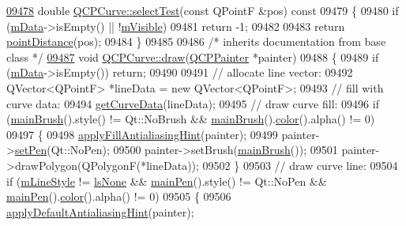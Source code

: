 \begin{DoxyCode}
\hypertarget{a00115_source_l09478}{}\hyperlink{a00028_a01f92730eb23ad5b222be95f2b7aa500}{09478} \textcolor{keywordtype}{double} \hyperlink{a00028_a01f92730eb23ad5b222be95f2b7aa500}{QCPCurve::selectTest}(\textcolor{keyword}{const} QPointF &pos)\textcolor{keyword}{ const}
09479 \textcolor{keyword}{}\{
09480   \textcolor{keywordflow}{if} (\hyperlink{a00028_a88d533e455bca96004b049e99168731b}{mData}->isEmpty() || !\hyperlink{a00044_a62e3aed8427d6ce3ccf716f285106cb3}{mVisible})
09481     \textcolor{keywordflow}{return} -1;
09482   
09483   \textcolor{keywordflow}{return} \hyperlink{a00028_acd7a68c6f268ce1ab845eaf69fc2c6a6}{pointDistance}(pos);
09484 \}
09485 
09486 \textcolor{comment}{/* inherits documentation from base class */}
\hypertarget{a00115_source_l09487}{}\hyperlink{a00028_a2361302d2fc6ec669849bd3bca00c4b2}{09487} \textcolor{keywordtype}{void} \hyperlink{a00028_a2361302d2fc6ec669849bd3bca00c4b2}{QCPCurve::draw}(\hyperlink{a00047}{QCPPainter} *painter)
09488 \{
09489   \textcolor{keywordflow}{if} (\hyperlink{a00028_a88d533e455bca96004b049e99168731b}{mData}->isEmpty()) \textcolor{keywordflow}{return};
09490   
09491   \textcolor{comment}{// allocate line vector:}
09492   QVector<QPointF> *lineData = \textcolor{keyword}{new} QVector<QPointF>;
09493   \textcolor{comment}{// fill with curve data:}
09494   \hyperlink{a00028_afa895f8ba9ae34fea6ecea295fd7b1e5}{getCurveData}(lineData);
09495   \textcolor{comment}{// draw curve fill:}
09496   \textcolor{keywordflow}{if} (\hyperlink{a00024_ae74c123832da180c17e22203e748d9b7}{mainBrush}().style() != Qt::NoBrush && \hyperlink{a00024_ae74c123832da180c17e22203e748d9b7}{mainBrush}().\hyperlink{a00116_ae35093fbf4f645dcefd930ca8c68b622}{color}().alpha() != 0)
09497   \{
09498     \hyperlink{a00024_ac08a480155895e674dbfe5a5670e0ff3}{applyFillAntialiasingHint}(painter);
09499     painter->\hyperlink{a00047_af9c7a4cd1791403901f8c5b82a150195}{setPen}(Qt::NoPen);
09500     painter->setBrush(\hyperlink{a00024_ae74c123832da180c17e22203e748d9b7}{mainBrush}());
09501     painter->drawPolygon(QPolygonF(*lineData));
09502   \}
09503   \textcolor{comment}{// draw curve line:}
09504   \textcolor{keywordflow}{if} (\hyperlink{a00028_ae1f35ae2b15aee8e15bcdfec5be95156}{mLineStyle} != \hyperlink{a00028_a2710e9f79302152cff794c6e16cc01f1aec1601a191cdf0b4e761c4c66092cc48}{lsNone} && \hyperlink{a00024_a19276ed2382a3a06464417b8788b1451}{mainPen}().style() != Qt::NoPen && 
      \hyperlink{a00024_a19276ed2382a3a06464417b8788b1451}{mainPen}().\hyperlink{a00116_ae35093fbf4f645dcefd930ca8c68b622}{color}().alpha() != 0)
09505   \{
09506     \hyperlink{a00024_a76e9d6cc7972dc1528f526d163766aca}{applyDefaultAntialiasingHint}(painter);

\end{DoxyCode}
